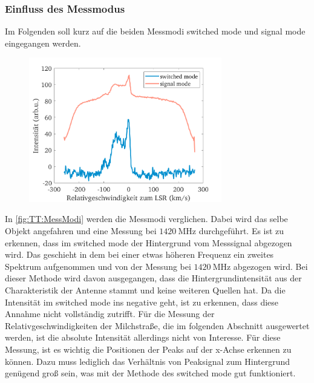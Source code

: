 \documentclass[../../main.tex]{subfiles}
\begin{document}
    \subsubsection{Einfluss des Messmodus}
        Im Folgenden soll kurz auf die beiden Messmodi \glqq{}switched mode\grqq{} und \glqq{}signal mode\grqq{} eingegangen werden.
        \begin{figure}[H]
            \centering
            \includegraphics[width=0.75\textwidth]{Bilddateien/Modi/Fig_10.png}
            \caption{}
            \label{fig:TT:MessModi}
        \end{figure}
        In \autoref{fig:TT:MessModi} werden die Messmodi verglichen. Dabei wird das selbe Objekt angefahren und eine Messung bei $\SI{1420}{\mega \hertz}$ durchgeführt. Es ist zu erkennen, dass im \glqq{}switched mode\grqq{} der Hintergrund vom Messsignal abgezogen wird. Das geschieht in dem bei einer etwas höheren Frequenz ein zweites Spektrum aufgenommen und von der Messung bei $\SI{1420}{\mega \hertz}$ abgezogen wird. Bei dieser Methode wird davon ausgegangen, dass die Hintergrundintensität aus der Charakteristik der Antenne stammt und keine weiteren Quellen hat. Da die Intensität im \glqq{}switched mode\grqq{} ins negative geht, ist zu erkennen, dass diese Annahme nicht vollständig zutrifft. Für die Messung der Relativgeschwindigkeiten der Milchstraße, die im folgenden Abschnitt ausgewertet werden, ist die absolute Intensität allerdings nicht von Interesse. Für diese Messung, ist es wichtig die Positionen der Peaks auf der x-Achse erkennen zu können. Dazu muss lediglich das Verhältnis von Peaksignal zum Hintergrund genügend groß sein, was mit der Methode des \glqq{}switched mode\grqq{} gut funktioniert. 
    
\end{document}
